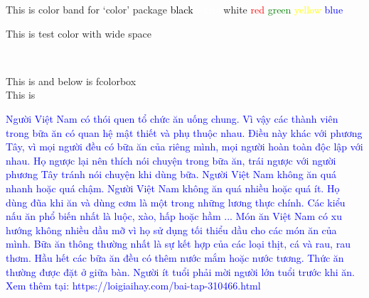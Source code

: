 \documentclass[12pt, a4paper]{report}
\begin{document}
\newpage

This is color band for `color' package
\textcolor{black}{black} 
\textcolor{white}{white} white
\textcolor{red}{red} 
\textcolor{green}{green} 
\textcolor{yellow}{yellow}
\textcolor{blue}{blue}

This is test color with wide space

\color{red}
\lipsum[1]\\
\color{black}


This is \colorbox{green}{\lipsum[1]} and below is fcolorbox\\
This is \\


\newpage

\selectfont

\textcolor{blue}
{
Người Việt Nam có thói quen tổ chức ăn uống chung.
Vì vậy các thành viên trong bữa ăn có quan hệ mật thiết và phụ thuộc nhau.
Điều này khác với phương Tây, vì mọi người đều có bữa ăn của riêng mình,
mọi người hoàn toàn độc lập với nhau. Họ ngược lại nên thích nói chuyện trong bữa ăn, 
trái ngược với người phương Tây tránh nói chuyện khi dùng bữa. 
Người Việt Nam không ăn quá nhanh hoặc quá chậm. Người Việt Nam không ăn quá nhiều hoặc quá ít.
Họ dùng đũa khi ăn và dùng cơm là một trong những lương thực chính. 
Các kiểu nấu ăn phổ biến nhất là luộc, xào, hấp hoặc hầm ...
Món ăn Việt Nam có xu hướng không nhiều dầu mỡ vì họ sử dụng tối thiểu dầu cho các món ăn của mình. 
Bữa ăn thông thường nhất là sự kết hợp của các loại thịt, cá và rau, rau thơm. 
Hầu hết các bữa ăn đều có thêm nước mắm hoặc nước tương.
Thức ăn thường được đặt ở giữa bàn. Người ít tuổi phải mời người lớn tuổi trước khi ăn.
Xem thêm tại: https://loigiaihay.com/bai-tap-310466.html
}




\newpage
{}
\selectfont
\end{document}
